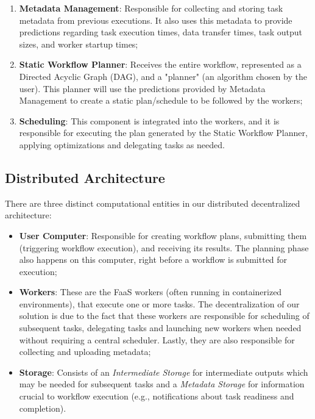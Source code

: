 \documentclass[conference]{IEEEtran}
\begin{document}
\begin{enumerate}
    \item \textbf{Metadata Management}: Responsible for collecting and storing task metadata from previous executions. It also uses this metadata to provide predictions regarding task execution times, data transfer times, task output sizes, and worker startup times;
    \item \textbf{Static Workflow Planner}: Receives the entire workflow, represented as a Directed Acyclic Graph (DAG), and a "planner" (an algorithm chosen by the user). This planner will use the predictions provided by Metadata Management to create a static plan/schedule to be followed by the workers;
    \item \textbf{Scheduling}: This component is integrated into the workers, and it is responsible for executing the plan generated by the Static Workflow Planner, applying optimizations and delegating tasks as needed.
\end{enumerate}

\subsection{Distributed Architecture}

There are three distinct computational entities in our distributed decentralized architecture:

\begin{itemize}
    \item \textbf{User Computer}: Responsible for creating workflow plans, submitting them (triggering workflow execution), and receiving its results. The planning phase also happens on this computer, right before a workflow is submitted for execution;
    \item \textbf{Workers}: These are the FaaS workers (often running in containerized environments), that execute one or more tasks. The decentralization of our solution is due to the fact that these workers are responsible for scheduling of subsequent tasks, delegating tasks and launching new workers when needed without requiring a central scheduler. Lastly, they are also responsible for collecting and uploading metadata;
    \item \textbf{Storage}: Consists of an \textit{Intermediate Storage} for intermediate outputs which may be needed for subsequent tasks and a \textit{Metadata Storage} for information crucial to workflow execution (e.g., notifications about task readiness and completion).
\end{itemize}
\end{document}
